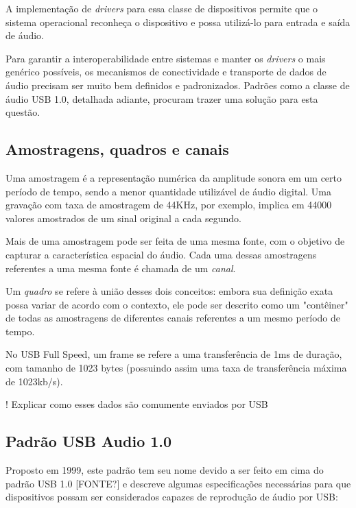 
A implementação de \textit{drivers} para essa classe de dispositivos permite que o sistema operacional reconheça o dispositivo e possa utilizá-lo para entrada e saída de áudio. 

Para garantir a interoperabilidade entre sistemas e manter os \textit{drivers} o mais genérico possíveis, os mecanismos de conectividade e transporte de dados de áudio precisam ser muito bem definidos e padronizados.  Padrões como a classe de áudio USB 1.0, detalhada adiante, procuram trazer uma solução para esta questão.

\subsection{Amostragens, quadros e canais}
Uma amostragem é a representação numérica da amplitude sonora em um certo período de tempo, sendo a menor quantidade utilizável de áudio digital. Uma gravação com taxa de amostragem de 44KHz, por exemplo, implica em 44000 valores amostrados de um sinal original a cada segundo.

Mais de uma amostragem pode ser feita de uma mesma fonte, com o objetivo de capturar a característica espacial do áudio. Cada uma dessas amostragens referentes a uma mesma fonte é chamada de um \textit{canal}.


Um \textit{quadro} se refere à união desses dois conceitos: embora sua definição exata possa variar de acordo com o contexto, ele pode ser descrito como um "contêiner" de todas as amostragens de diferentes canais referentes a um mesmo período de tempo.

No USB Full Speed, um frame se refere a uma transferência de 1ms de duração, com tamanho de 1023 bytes (possuindo assim uma taxa de transferência máxima de 1023kb/s).

! Explicar como esses dados são comumente enviados por USB

\subsection{Padrão USB Audio 1.0}

Proposto em 1999, este padrão tem seu nome devido a ser feito em cima do padrão USB 1.0 [FONTE?] e descreve algumas especificações necessárias para que dispositivos possam ser considerados capazes de reprodução de áudio por USB:

